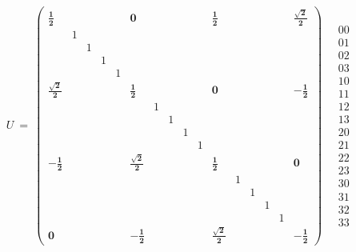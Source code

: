\documentclass[12pt]{article}
\begin{document}
\begin{equation}
U\ =\ 
\begin{pmatrix}
\pmb{\frac{1}{2}} &&&&& \pmb{0} &&&&& \pmb{\frac{1}{2}} &&&&& \pmb{\frac{\sqrt{2}}{2}} \\
  & 1 &   &   &   &   &   &   &   &   &   &   &   &   &   &   \\
  &   & 1 &   &   &   &   &   &   &   &   &   &   &   &   &   \\
  &   &   & 1 &   &   &   &   &   &   &   &   &   &   &   &   \\
  &   &   &   & 1 &   &   &   &   &   &   &   &   &   &   &   \\
\pmb{\frac{\sqrt{2}}{2}} &&&&& \pmb{\frac{1}{2}} &&&&& \pmb{0} &&&&& \pmb{-\frac{1}{2}} \\
  &   &   &   &   &   & 1 &   &   &   &   &   &   &   &   &   \\
  &   &   &   &   &   &   & 1 &   &   &   &   &   &   &   &   \\
  &   &   &   &   &   &   &   & 1 &   &   &   &   &   &   &   \\
  &   &   &   &   &   &   &   &   & 1 &   &   &   &   &   &   \\
\pmb{-\frac{1}{2}} &&&&& \pmb{\frac{\sqrt{2}}{2}} &&&&& \pmb{\frac{1}{2}} &&&&& \pmb{0} \\
  &   &   &   &   &   &   &   &   &   &   & 1 &   &   &   &   \\
  &   &   &   &   &   &   &   &   &   &   &   & 1 &   &   &   \\
  &   &   &   &   &   &   &   &   &   &   &   &   & 1 &   &   \\
  &   &   &   &   &   &   &   &   &   &   &   &   &   & 1 &   \\
\pmb{0} &&&&& \pmb{-\frac{1}{2}} &&&&& \pmb{\frac{\sqrt{2}}{2}} &&&&& \pmb{-\frac{1}{2}} 
\end{pmatrix}
\quad
\begin{matrix}
00 \\ 01 \\ 02 \\ 03 \\ 10 \\ 11 \\ 12 \\ 13 \\ 20 \\ 21 \\ 22 \\ 23 \\ 30 \\ 31 \\ 32 \\ 33 
\end{matrix}
\end{equation}
\end{document}
